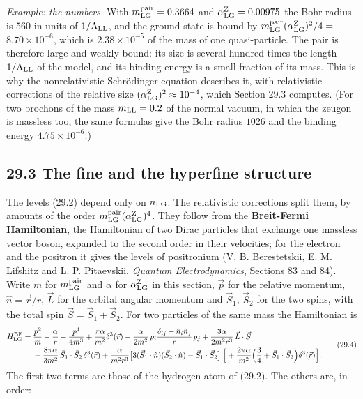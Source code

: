 \documentclass[
  10pt,
]{article}
\begin{document}
\emph{Example: the numbers.} With \(m^{\rm pair}_{\rm LG}=0.3664\) and
\(\alpha^{\rm Z}_{\rm LG}=0.00975\) the Bohr radius is \(560\) in units
of \(1/\Lambda_{\rm LL}\), and the ground state is bound by
\(m^{\rm pair}_{\rm LG}(\alpha^{\rm Z}_{\rm LG})^2/4=\)
\(8.70\times10^{-6}\), which is \(2.38\times10^{-5}\) of the mass of one
quasi-particle. The pair is therefore large and weakly bound: its size
is several hundred times the length \(1/\Lambda_{\rm LL}\) of the model,
and its binding energy is a small fraction of its mass. This is why the
nonrelativistic Schrödinger equation describes it, with relativistic
corrections of the relative size
\((\alpha^{\rm Z}_{\rm LG})^2\approx10^{-4}\), which Section 29.3
computes. (For two brochons of the mass \(m_{\rm LL}=0.2\) of the normal
vacuum, in which the zeugon is massless too, the same formulas give the
Bohr radius \(1026\) and the binding energy \(4.75\times10^{-6}\).)

\hypertarget{the-fine-and-the-hyperfine-structure}{%
\subsection{29.3 The fine and the hyperfine
structure}\label{the-fine-and-the-hyperfine-structure}}

The levels (29.2) depend only on \(n_{\rm LG}\). The relativistic
corrections split them, by amounts of the order
\(m^{\rm pair}_{\rm LG}(\alpha^{\rm Z}_{\rm LG})^4\). They follow from
the \textbf{Breit-Fermi Hamiltonian}, the Hamiltonian of two Dirac
particles that exchange one massless vector boson, expanded to the
second order in their velocities; for the electron and the positron it
gives the levels of positronium (V. B. Berestetskii, E. M. Lifshitz and
L. P. Pitaevskii, \emph{Quantum Electrodynamics}, Sections 83 and 84).
Write \(m\) for \(m^{\rm pair}_{\rm LG}\) and \(\alpha\) for
\(\alpha^{\rm Z}_{\rm LG}\) in this section, \(\vec p\) for the relative
momentum, \(\hat n=\vec r/r\), \(\vec L\) for the orbital angular
momentum and \(\vec S_1\), \(\vec S_2\) for the two spins, with the
total spin \(\vec S=\vec S_1+\vec S_2\). For two particles of the same
mass the Hamiltonian is
\[\begin{aligned}H^{\rm BF}_{\rm LG}={}&\frac{p^2}m-\frac\alpha r-\frac{p^4}{4m^3}+\frac{\pi\alpha}{m^2}\delta^3(\vec r)-\frac\alpha{2m^2}\,p_i\frac{\delta_{ij}+\hat n_i\hat n_j}r\,p_j+\frac{3\alpha}{2m^2r^3}\,\vec L\cdot\vec S\\&+\frac{8\pi\alpha}{3m^2}\,\vec S_1\cdot\vec S_2\,\delta^3(\vec r)+\frac\alpha{m^2r^3}\big[3(\vec S_1\cdot\hat n)(\vec S_2\cdot\hat n)-\vec S_1\cdot\vec S_2\big]\;\Big[{}+\frac{2\pi\alpha}{m^2}\Big(\frac34+\vec S_1\cdot\vec S_2\Big)\delta^3(\vec r)\Big].\end{aligned}\tag{29.4}\]
The first two terms are those of the hydrogen atom of (29.2). The others
are, in order:
\end{document}

